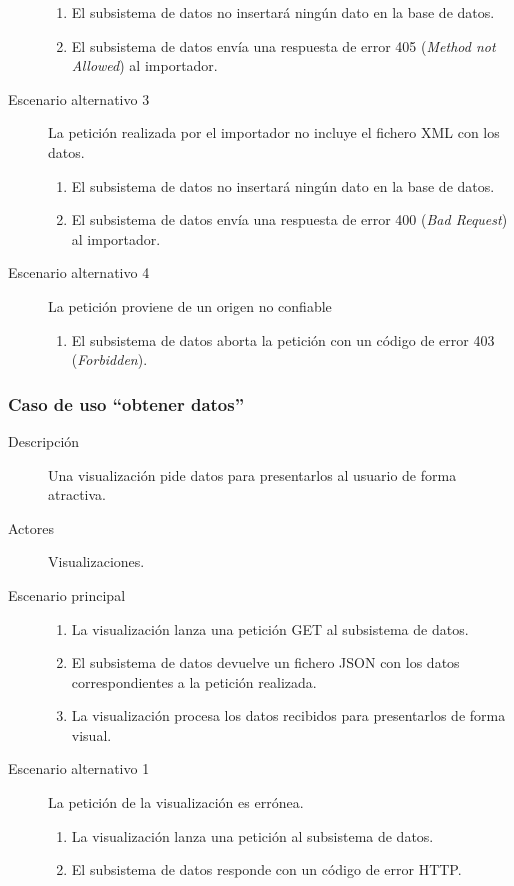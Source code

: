 \begin{description}
							\begin{enumerate}
							\item El subsistema de datos no insertará ningún dato en la base de datos.
							\item El subsistema de datos envía una respuesta de error 405 (\textit{Method not Allowed}) al importador.
							\end{enumerate}
\item[Escenario alternativo 3] La petición realizada por el importador no incluye el fichero XML con los datos.
							\begin{enumerate}
							\item El subsistema de datos no insertará ningún dato en la base de datos.
							\item El subsistema de datos envía una respuesta de error 400 (\textit{Bad Request}) al importador.
							\end{enumerate}
\item[Escenario alternativo 4] La petición proviene de un origen no confiable
							\begin{enumerate}
							\item El subsistema de datos aborta la petición con un código de error 403 (\textit{Forbidden}).
							\end{enumerate}
\end{description}	

\subsubsection{Caso de uso ``obtener datos''}
\begin{description}
\item[Descripción] Una visualización pide datos para presentarlos al usuario de forma atractiva.
\item[Actores] Visualizaciones.
\item[Escenario principal] 	\hfill
							\begin{enumerate}
							\item La visualización lanza una petición GET al subsistema de datos.
							\item El subsistema de datos devuelve un fichero JSON con los datos correspondientes a la petición realizada.
							\item La visualización procesa los datos recibidos para presentarlos de forma visual.
							\end{enumerate}
\item[Escenario alternativo 1] La petición de la visualización es errónea.
							\begin{enumerate}
							\item La visualización lanza una petición al subsistema de datos.
							\item El subsistema de datos responde con un código de error HTTP.
							\end{enumerate}
\end{description}